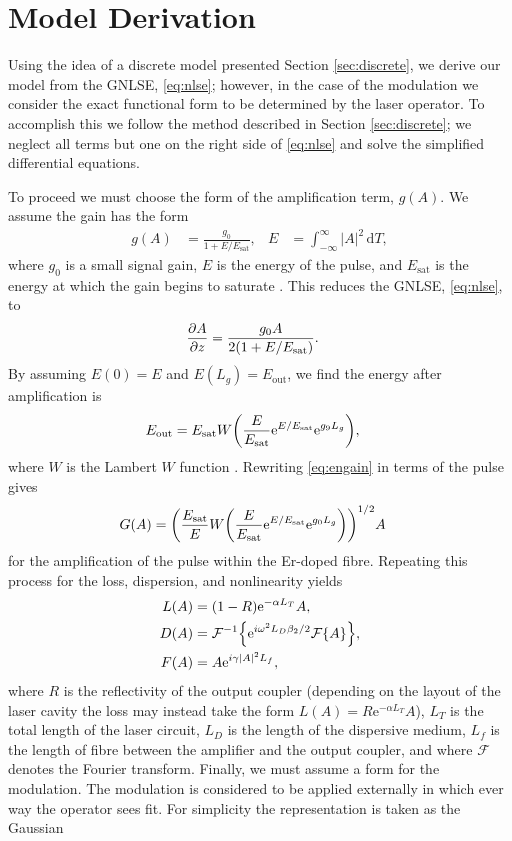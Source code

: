 \documentclass[10pt,twocolumn,a4paper]{article}
\let\originalleft\left
\let\originalright\right
\renewcommand{\left}{\mathopen{}\mathclose\bgroup\originalleft}
\renewcommand{\right}{\aftergroup\egroup\originalright}
\providecommand{\df}{\textrm{d}}
\newcommand{\pdiff}[3][\hspace{-0.5pt}]{\frac{\partial^{#1}#2}{\partial{#3}^{#1}}}
\newcommand{\Es}{E_{\textrm{sat}}}
\newcommand{\FT}[1]{\mathcal{F}\left\{ #1 \right\}}
\newcommand{\FTi}[1]{\mathcal{F}^{-1}\left\{ #1 \right\}}
\begin{document}
\section{Model Derivation}
\label{sec:model}
Using the idea of a discrete model presented Section \ref{sec:discrete}, we derive our model from the GNLSE, \eqref{eq:nlse}; however, in the case of the modulation we consider the exact functional form to be determined by the laser operator. To accomplish this we follow the method described in Section \ref{sec:discrete}; we neglect all terms but one on the right side of \eqref{eq:nlse} and solve the simplified differential equations.

To proceed we must choose the form of the amplification term, $g(A)$. We assume the gain has the form
\begin{align}
	g(A) &= \frac{g_0}{1 + E / \Es},& E &= \int_{-\infty}^\infty |A|^2 \, \df T,
	\label{eq:energy}
\end{align}
where $g_0$ is a small signal gain, $E$ is the energy of the pulse, and $\Es$ is the energy at which the gain begins to saturate \cite{haus1984, shtyrina2017, silfvast2004}. This reduces the GNLSE, \eqref{eq:nlse}, to
\begin{align}
	\pdiff{A}{z} &= \frac{g_0 A}{2 \left( 1 + E / \Es \right)}.
\end{align}
By assuming $E(0) = E$ and $E(L_g) = E_{\text{out}}$, we find the energy after amplification is
\begin{align}
	\label{eq:engain}
	E_{\text{out}} &= \Es W \left( \frac{E}{\Es} \textrm{e}^{E / \Es} \textrm{e}^{g_9 L_g} \right),
\end{align}
where $W$ is the Lambert $W$ function \cite{corless1996}. Rewriting \eqref{eq:engain} in terms of the pulse gives
\begin{align}
	G(A) &= \left( \frac{\Es}{E} W \left( \frac{E}{\Es} \textrm{e}^{E/\Es} \textrm{e}^{g_0 L_g} \right) \right)^{1/2} A
\end{align}
for the amplification of the pulse within the Er-doped fibre. Repeating this process for the loss, dispersion, and nonlinearity yields
\begin{align}
	L(A) &= (1 - R) \textrm{e}^{- \alpha L_T}A, \\
	D(A) &= \FTi{\textrm{e}^{i \omega^2 L_D\beta_2/2} \FT{A}}, \\
	F(A) &= A \textrm{e}^{i \gamma |A|^2 L_f},
\end{align}
where $R$ is the reflectivity of the output coupler (depending on the layout of the laser cavity the loss may instead take the form $L(A) = R \textrm{e}^{- \alpha L_T}A$), $L_T$ is the total length of the laser circuit, $L_D$ is the length of the dispersive medium, $L_f$ is the length of fibre between the amplifier and the output coupler, and where $\mathcal{F}$ denotes the Fourier transform. Finally, we must assume a form for the modulation. The modulation is considered to be applied externally in which ever way the operator sees fit. For simplicity the representation is taken as the Gaussian
\end{document}
